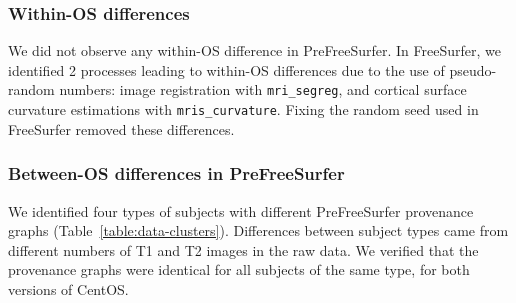 \documentclass[a4paper,num-refs]{oup-contemporary}
\newcommand{\tristan}[1]{\color{orange}\textbf{From Tristan:}#1\color{black}}
\begin{document}
\subsubsection{Within-OS differences}

We did not observe any within-OS difference in PreFreeSurfer. In
FreeSurfer, we identified 2 processes leading to within-OS differences due
to the use of pseudo-random numbers: image registration with
\texttt{mri\_segreg}, and cortical surface curvature estimations with
\texttt{mris\_curvature}. Fixing the random seed used in FreeSurfer removed
these differences. 
  
  
  
  
  
  
  

\subsubsection{Between-OS differences in PreFreeSurfer}

We identified four types of subjects with different PreFreeSurfer
provenance graphs (Table~\ref{table:data-clusters}). Differences between
subject types came from different numbers of T1 and T2 images in the
raw data. We verified that
the provenance graphs were identical for all subjects of the same type, for
both versions of CentOS.
\end{document}
